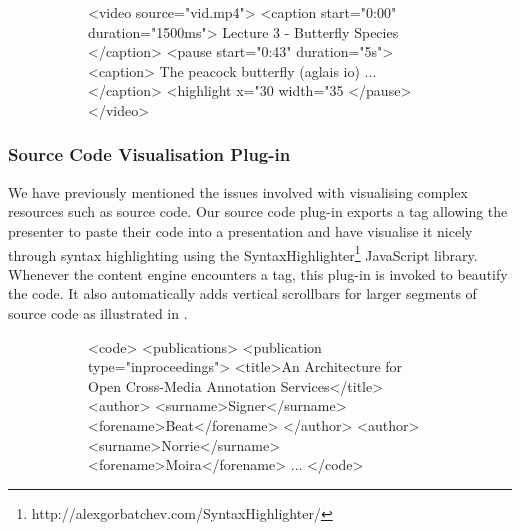      \begin{figure}[h!]
      \begin{subfigure}{0.53\textwidth}
       \vspace{-1em}
       \begin{lstxml*}
<video source="vid.mp4">
 <caption start="0:00" duration="1500ms">
  Lecture 3 - Butterfly Species
 </caption>
 <pause start="0:43" duration="5s">
  <caption>
   The peacock butterfly (aglais io) ...
  </caption>
  <highlight x="30%
             width="35%
 </pause>
</video>
       \end{lstxml*}
      \end{subfigure}
      \hfill
      \begin{subfigure}{0.43\textwidth}
      \end{subfigure}
      \renewcommand{\figurename}{Listing}
      \renewcommand{\figureshortname}{Lst.}
     \end{figure}

 \newpage

    \subsubsection{Source Code Visualisation Plug-in}

     We have previously mentioned the issues involved with visualising complex
     resources such as source code. Our \mxp source code plug-in exports a
      tag allowing the presenter to paste their code into a
     presentation and have \mxp visualise it nicely through syntax highlighting
     using the
     SyntaxHighlighter\footnote{http://alexgorbatchev.com/SyntaxHighlighter/}
     JavaScript library. Whenever the content engine encounters a 
     tag, this plug-in is invoked to beautify the code. It also automatically
     adds vertical scrollbars for larger segments of source code as illustrated
     in .

     \begin{figure}[h!]
      \begin{subfigure}{0.53\textwidth}
       \vspace{-1em}
       \begin{lstxml*}
<code>
 <publications>
  <publication type="inproceedings">
   <title>An Architecture for Open Cross-Media
          Annotation Services</title>
   <author>
     <surname>Signer</surname>
     <forename>Beat</forename>
   </author>
   <author>
     <surname>Norrie</surname>
     <forename>Moira</forename>
   ...
</code>
       \end{lstxml*}
      \end{subfigure}
      \hfill
      \begin{subfigure}{0.43\textwidth}
      \end{subfigure}
      \renewcommand{\figurename}{Listing}
      \renewcommand{\figureshortname}{Lst.}
     \end{figure}

